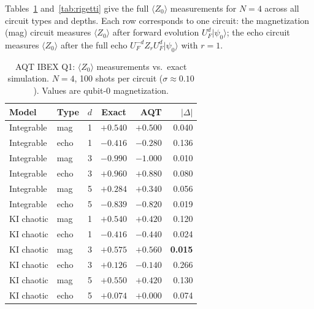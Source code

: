 \documentclass[twocolumn,showpacs,preprintnumbers,amsmath,amssymb,aps,prl]{revtex4-2}
\begin{document}
Tables~\ref{tab:aqt} and~\ref{tab:rigetti} give the full $\langle Z_0 \rangle$
measurements for $N=4$ across all circuit types and depths. Each row corresponds
to one circuit: the magnetization (mag) circuit measures $\langle Z_0 \rangle$
after forward evolution $U_F^d |\psi_0\rangle$; the echo circuit measures
$\langle Z_0 \rangle$ after the full echo $U_F^{-d} Z_r U_F^d |\psi_0\rangle$
with $r=1$.

\begin{table}[h]
\caption{AQT IBEX Q1: $\langle Z_0 \rangle$ measurements vs.\ exact simulation.
$N=4$, 100 shots per circuit ($\sigma \approx 0.10$). Values are qubit-0
magnetization.}
\label{tab:aqt}
\begin{ruledtabular}
\begin{tabular}{llccrr}
Model & Type & $d$ & Exact & AQT & $|\Delta|$ \\
\hline
Integrable & mag  & 1 & $+0.540$ & $+0.500$ & 0.040 \\
Integrable & echo & 1 & $-0.416$ & $-0.280$ & 0.136 \\
Integrable & mag  & 3 & $-0.990$ & $-1.000$ & 0.010 \\
Integrable & echo & 3 & $+0.960$ & $+0.880$ & 0.080 \\
Integrable & mag  & 5 & $+0.284$ & $+0.340$ & 0.056 \\
Integrable & echo & 5 & $-0.839$ & $-0.820$ & 0.019 \\
KI chaotic & mag  & 1 & $+0.540$ & $+0.420$ & 0.120 \\
KI chaotic & echo & 1 & $-0.416$ & $-0.440$ & 0.024 \\
KI chaotic & mag  & 3 & $+0.575$ & $+0.560$ & \textbf{0.015} \\
KI chaotic & echo & 3 & $+0.126$ & $-0.140$ & 0.266 \\
KI chaotic & mag  & 5 & $+0.550$ & $+0.420$ & 0.130 \\
KI chaotic & echo & 5 & $+0.074$ & $+0.000$ & 0.074 \\
\end{tabular}
\end{ruledtabular}
\end{table}
\end{document}
